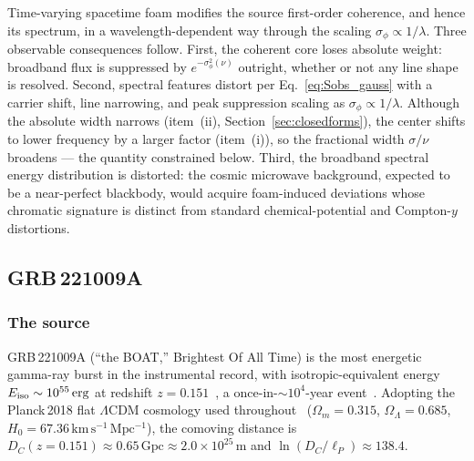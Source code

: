 \documentclass[aps,prd,onecolumn,amsmath,amssymb]{revtex4-2}
\begin{document}
Time-varying spacetime foam modifies the source first-order coherence,
and hence its spectrum, in a wavelength-dependent way through
the scaling $\sigma_\phi \propto 1/\lambda$. Three observable
consequences follow.  First, the coherent core loses absolute weight:
broadband flux is suppressed by $e^{-\sigma_\phi^2(\nu)}$ outright, whether or
not any line shape is resolved.  Second, spectral features distort per
Eq.~\eqref{eq:Sobs_gauss} with a carrier shift, line narrowing, and peak
suppression scaling as $\sigma_\phi\propto1/\lambda$.  Although the
absolute width narrows (item~(ii), Section~\ref{sec:closedforms}), the
center shifts to lower frequency by a larger factor (item~(i)), so the
fractional width $\sigma/\nu$ broadens --- the quantity
constrained below. Third, the
broadband spectral energy distribution is distorted: the cosmic
microwave background, expected to be a near-perfect blackbody, would
acquire foam-induced deviations whose chromatic signature is distinct
from standard chemical-potential and Compton-$y$ distortions.

\subsection{GRB\,221009A}
\label{sec:grb221009a}

\subsubsection{The source}
\label{sec:grb_source}

GRB\,221009A (``the BOAT,'' Brightest Of All Time) is the most
energetic gamma-ray burst in the instrumental record, with
isotropic-equivalent energy $E_{\rm iso}\sim10^{55}\,\mathrm{erg}$ at
redshift $z=0.151$~\cite{Ravasio2024}, a once-in-$\sim10^4$-year event~\cite{Burns2023}.
Adopting the Planck\,2018 flat $\Lambda$CDM cosmology used throughout~\cite{Aghanim2020}
($\Omega_m=0.315$, $\Omega_\Lambda=0.685$,
$H_0=67.36\,\mathrm{km\,s^{-1}\,Mpc^{-1}}$), the comoving distance is
$D_C(z=0.151)\approx0.65\,\mathrm{Gpc}\approx2.0\times10^{25}\,\mathrm{m}$
and $\ln(D_C/\ell_P)\approx138.4$.
\end{document}
